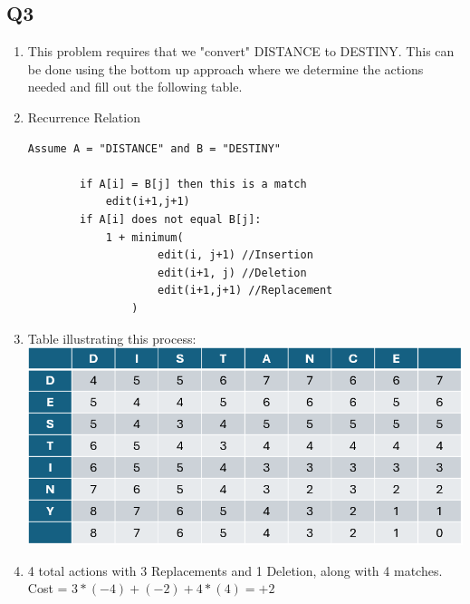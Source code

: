 \documentclass{article}
\begin{document}
\subsection*{Q3}
\begin{enumerate}[label=(\alph*)]
    \item This problem requires that we "convert" DISTANCE to DESTINY. This can be done using the bottom up approach where we determine the actions needed and fill out the following table.
    \item Recurrence Relation
    \begin{lstlisting}[frame=single]
        Assume A = "DISTANCE" and B = "DESTINY"

        if A[i] = B[j] then this is a match
            edit(i+1,j+1)
        if A[i] does not equal B[j]:
            1 + minimum(
                    edit(i, j+1) //Insertion
                    edit(i+1, j) //Deletion
                    edit(i+1,j+1) //Replacement    
                )
        \end{lstlisting}
    \item Table illustrating this process:
    \subitem \includegraphics[width=1\textwidth]{editDistance.png}

    \item 4 total actions with 3 Replacements and 1 Deletion, along with 4 matches.
    \subitem Cost = $3*(-4) + (-2) + 4*(4) = +2$
\end{enumerate}

\end{document}
